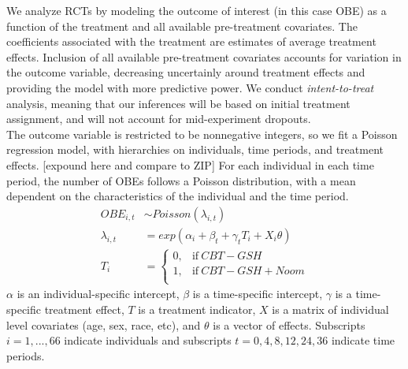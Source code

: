 \documentclass{article}
\begin{document}
We analyze RCTs by modeling the outcome of interest (in this case OBE) as a function of the treatment and all available pre-treatment covariates.  The coefficients associated with the treatment are estimates of average treatment effects.  Inclusion of all available pre-treatment covariates accounts for variation in the outcome variable, decreasing uncertainly around treatment effects and providing the model with more predictive power.  We conduct \emph{intent-to-treat} analysis, meaning that our inferences will be based on initial treatment assignment, and will not account for mid-experiment dropouts. \\
The outcome variable is restricted to be nonnegative integers, so we fit a Poisson regression model, with hierarchies on individuals, time periods, and treatment effects. [expound here and compare to ZIP] For each individual in each time period, the number of OBEs follows a Poisson distribution, with a mean dependent on the characteristics of the individual and the time period.  
\begin{align}
OBE_{i,t} &\sim Poisson(\lambda_{i,t}) \\
\lambda_{i,t} &= exp(\alpha_i + \beta_t + \gamma_tT_i + X_i\theta) \\
T_i &=
    \begin{cases}
      0, & \text{if}\ CBT-GSH \\
      1, & \text{if}\ CBT-GSH + Noom \\
    \end{cases}
\end{align}
$\alpha$ is an individual-specific intercept, $\beta$ is a time-specific intercept, $\gamma$ is a time-specific treatment effect, $T$ is a treatment indicator, $X$ is a matrix of individual level covariates (age, sex, race, etc), and $\theta$ is a vector of effects. Subscripts $i = 1, ..., 66$ indicate individuals and subscripts $t = 0, 4, 8, 12, 24, 36$ indicate time periods.
\end{document}
